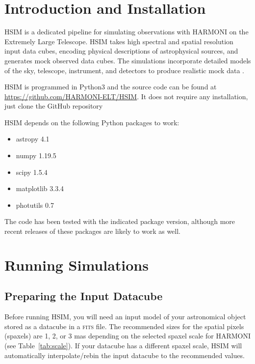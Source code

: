 \documentclass[12pt]{report}
\begin{document}
\section{Introduction and Installation}

HSIM is a dedicated pipeline for simulating observations with HARMONI on the Extremely Large Telescope. HSIM takes high spectral and spatial resolution input data cubes, encoding physical descriptions of astrophysical sources, and generates mock observed data cubes. The simulations incorporate detailed models of the sky, telescope, instrument, and detectors to produce realistic mock data \citep{Zieleniewski2015}.

HSIM is programmed in Python3 and the source code can be found at \url{https://github.com/HARMONI-ELT/HSIM}. It does not require any installation, just clone the GitHub repository 


HSIM depends on the following Python packages to work:

\begin{itemize}
\setlength\itemsep{-0.5ex}
\item astropy 4.1
\item numpy 1.19.5
\item scipy 1.5.4
\item matplotlib 3.3.4
\item photutils 0.7
\end{itemize}

The code has been tested with the indicated package version, although more recent releases of these packages are likely to work as well.


\section{Running Simulations}

\subsection{Preparing the Input Datacube}

Before running HSIM, you will need an input model of your astronomical object stored as a datacube in a \textsc{fits} file. The recommended sizes for the spatial pixels (spaxels) are 1, 2, or 3 mas depending on the selected spaxel scale for HARMONI (see Table~\ref{tab:scale}). If your datacube has a different spaxel scale, HSIM will automatically interpolate\slash rebin the input datacube to the recommended values.
\end{document}
